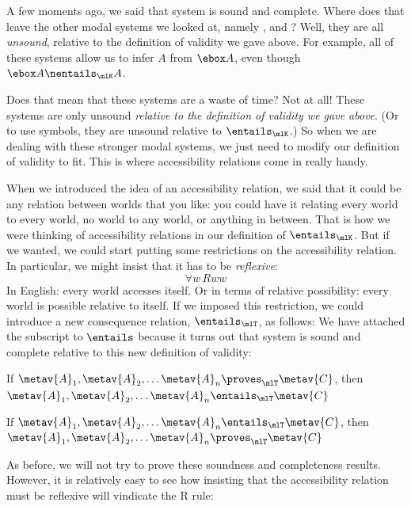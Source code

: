 A few moments ago, we said that system \mlK{} is sound and complete. Where does that leave the other modal systems we looked at, namely  \mlT, \mlSfour{} and \mlSfive? Well, they are all \emph{unsound}, relative to the definition of validity we gave above. For example, all of these systems allow us to infer $A$ from $\ebox A$, even though $\ebox A\nentails_\mlK A$.

Does that mean that these systems are a waste of time? Not at all! These systems are only unsound \emph{relative to the definition of validity we gave above}. (Or to use symbols, they are unsound relative to $\entails_\mlK$.) So when we are dealing with these stronger modal systems, we just need to modify our definition of validity to fit. This is where accessibility relations come in really handy.

When we introduced the idea of an accessibility relation, we said that it could be any relation between worlds that you like: you could have it relating every world to every world, no world to any world, or anything in between. That is how we were thinking of accessibility relations in our definition of $\entails_\mlK$. But if we wanted, we could start putting some restrictions on the accessibility relation. In particular, we might insist that it has to be \emph{reflexive}:
\[\forall w\, Rww\]
In English: every world accesses itself. Or in terms of relative possibility: every world is possible relative to itself. If we imposed this restriction, we could introduce a new consequence relation, $\entails_\mlT$, as follows:
We have attached the \mlT{} subscript to $\entails$ because it turns out that system \mlT{} is sound and complete relative to this new definition of validity:
\begin{compactlist}
	\item If $\metav{A}_1,\metav{A}_2, \dots \metav{A}_n\proves_\mlT\metav{C}$, then $\metav{A}_1,\metav{A}_2, \dots \metav{A}_n\entails_\mlT\metav{C}$
	\item If $\metav{A}_1,\metav{A}_2, \dots \metav{A}_n\entails_\mlT\metav{C}$, then $\metav{A}_1,\metav{A}_2, \dots \metav{A}_n\proves_\mlT\metav{C}$
\end{compactlist}
As before, we will not try to prove these soundness and completeness results. However, it is relatively easy to see how insisting that the accessibility relation must be reflexive will vindicate the R\mlT{} rule:
